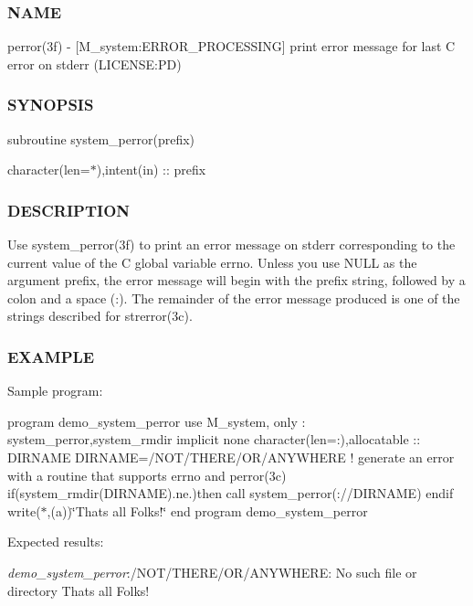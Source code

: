 \subsubsection*{N\+A\+ME}

perror(3f) -\/ \mbox{[}M\+\_\+system\+:E\+R\+R\+O\+R\+\_\+\+P\+R\+O\+C\+E\+S\+S\+I\+NG\mbox{]} print error message for last C error on stderr (L\+I\+C\+E\+N\+SE\+:PD) \subsubsection*{S\+Y\+N\+O\+P\+S\+IS}

subroutine system\+\_\+perror(prefix)

character(len=$\ast$),intent(in) \+:\+: prefix

\subsubsection*{D\+E\+S\+C\+R\+I\+P\+T\+I\+ON}

Use system\+\_\+perror(3f) to print an error message on stderr corresponding to the current value of the C global variable errno. Unless you use N\+U\+LL as the argument prefix, the error message will begin with the prefix string, followed by a colon and a space (\+:). The remainder of the error message produced is one of the strings described for strerror(3c).

\subsubsection*{E\+X\+A\+M\+P\+LE}

Sample program\+:

program demo\+\_\+system\+\_\+perror use M\+\_\+system, only \+: system\+\_\+perror,system\+\_\+rmdir implicit none character(len=\+:),allocatable \+:\+: D\+I\+R\+N\+A\+ME D\+I\+R\+N\+A\+ME=\textquotesingle{}/\+N\+O\+T/\+T\+H\+E\+R\+E/\+O\+R/\+A\+N\+Y\+W\+H\+E\+RE\textquotesingle{} ! generate an error with a routine that supports errno and perror(3c) if(system\+\_\+rmdir(\+D\+I\+R\+N\+A\+M\+E).ne.)then call system\+\_\+perror(\+:\textquotesingle{}//\+D\+I\+R\+N\+A\+ME) endif write($\ast$,\textquotesingle{}(a)\textquotesingle{})\char`\"{}\+That\textquotesingle{}s all Folks!\char`\"{} end program demo\+\_\+system\+\_\+perror

Expected results\+:

{\itshape demo\+\_\+system\+\_\+perror}\+:/\+N\+O\+T/\+T\+H\+E\+R\+E/\+O\+R/\+A\+N\+Y\+W\+H\+E\+RE\+: No such file or directory That\textquotesingle{}s all Folks! 


